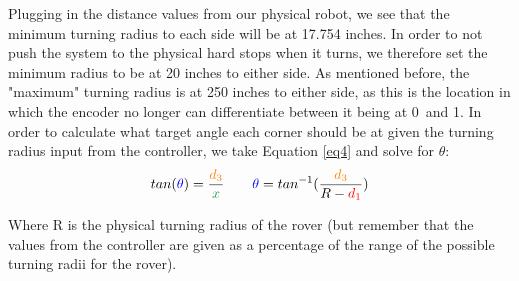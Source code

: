 \documentclass[12pt]{article}
\begin{document}
\noindent Plugging in the distance values from our physical robot, we see that the minimum turning radius to each side will be at 17.754 inches. In order to not push the system to the physical hard stops when it turns, we therefore set the minimum radius to be at 20 inches to either side. As mentioned before, the "maximum" turning radius is at 250 inches to either side, as this is the location in which the encoder no longer can differentiate between it being at 0\degree\ and 1\degree . In order to calculate what target angle each corner should be at given the turning radius input from the controller, we take Equation \ref{eq4} and solve for $\theta$:
\begin{equation}
	tan(\textcolor{blue}{\theta}) = \frac{\textcolor{orange}{d_3}}{\textcolor{ForestGreen}{x}} \qquad \textcolor{blue}{\theta} = tan^{-1}(\frac{\textcolor{orange}{d_3}}{R - \textcolor{red}{d_1}})
\end{equation}

\noindent Where R is the physical turning radius of the rover (but remember that the values from the controller are given as a percentage of the range of the possible turning radii for the rover). 
\end{document}
